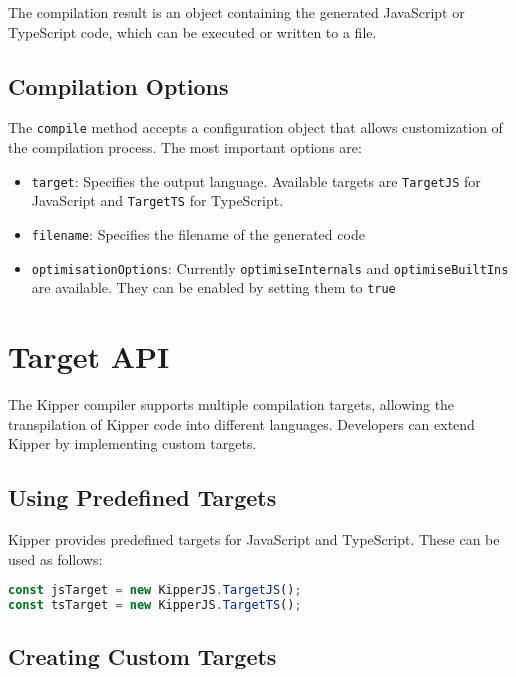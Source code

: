 The compilation result is an object containing the generated JavaScript or TypeScript code, which can be executed or written to a file.

\subsection{Compilation Options}
\label{subsec:compilation_options}

The \lstinline|compile| method accepts a configuration object that allows customization of the compilation process. The most important options are:

\begin{itemize}
	\item \lstinline|target|: Specifies the output language. Available targets are \lstinline|TargetJS| for JavaScript and \lstinline|TargetTS| for TypeScript.
	\item \lstinline|filename|: Specifies the filename of the generated code
	\item \lstinline|optimisationOptions|: Currently
	\lstinline|optimiseInternals| and \lstinline|optimiseBuiltIns| are available. They can be enabled by setting them to \lstinline|true|
\end{itemize}

\section{Target API}
\label{sec:target_api}

The Kipper compiler supports multiple compilation targets, allowing the transpilation of Kipper code into different languages. Developers can extend Kipper by implementing custom targets.

\subsection{Using Predefined Targets}
\label{subsec:using_targets}

Kipper provides predefined targets for JavaScript and TypeScript. These can be used as follows:

\begin{lstlisting}[language=Typescript, caption=Using Compilation Targets, label=lst:using_targets]
const jsTarget = new KipperJS.TargetJS();
const tsTarget = new KipperJS.TargetTS();
\end{lstlisting}

\subsection{Creating Custom Targets}
\label{subsec:custom_targets}

